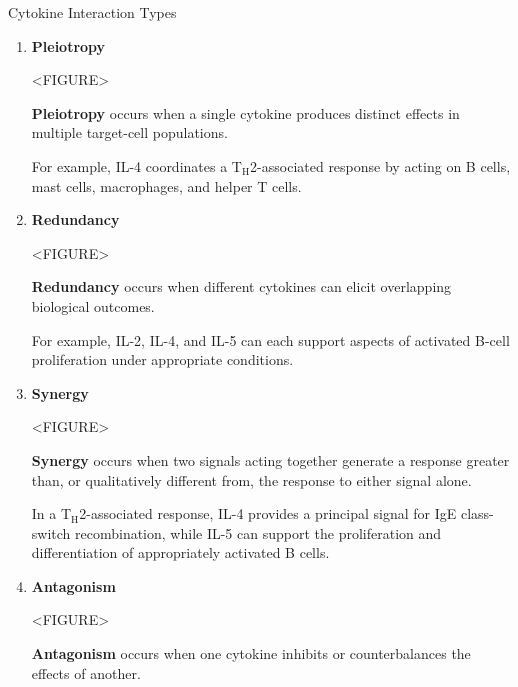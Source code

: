     \begin{core}{Cytokine Interaction Types}

      \begin{enumerate}

        \item \textbf{Pleiotropy}

          <FIGURE>

          \textbf{Pleiotropy} occurs when a single cytokine produces distinct effects in multiple target-cell populations.

          For example, IL-4 coordinates a T$_{\text{H}}$2-associated response by acting on B cells, mast cells, macrophages, and helper T cells.

        \item \textbf{Redundancy}

          <FIGURE>

          \textbf{Redundancy} occurs when different cytokines can elicit overlapping biological outcomes.

          For example, IL-2, IL-4, and IL-5 can each support aspects of activated B-cell proliferation under appropriate conditions.

        \item \textbf{Synergy}

          <FIGURE>

          \textbf{Synergy} occurs when two signals acting together generate a response greater than, or qualitatively different from, the response to either signal alone.

          In a T$_{\text{H}}$2-associated response, IL-4 provides a principal signal for IgE class-switch recombination, while IL-5 can support the proliferation and differentiation of appropriately activated B cells.

        \item \textbf{Antagonism} 

          <FIGURE>

          \textbf{Antagonism} occurs when one cytokine inhibits or counterbalances the effects of another.


\end{enumerate}
\end{core}
